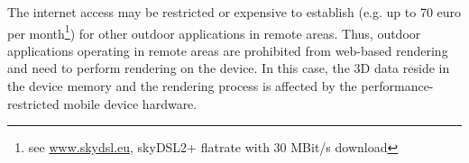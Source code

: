\documentclass[review]{elsarticle}
\begin{document}

The internet access may be restricted or expensive to establish (e.g. up to 70 euro per month\footnote{see \url{www.skydsl.eu}, skyDSL2+ flatrate with 30 MBit/s download}) for other outdoor applications in remote areas. Thus, outdoor applications operating in remote areas are prohibited from web-based rendering and need to perform rendering on the device. In this case, the 3D data reside in the device memory and the rendering process is affected by the performance-restricted mobile device hardware.

\end{document}
